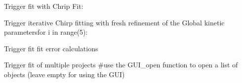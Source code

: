 \documentclass[letterpaper,10pt,english]{sphinxmanual}
\begin{document}
\begin{fulllineitems}
\begin{fulllineitems}
\begin{sphinxVerbatim}[commandchars=\\\{\}]
\end{sphinxVerbatim}

Trigger fit with Chrip Fit:

\begin{sphinxVerbatim}[commandchars=\\\{\}]
\end{sphinxVerbatim}

Trigger iterative Chirp fitting with fresh refinement of the Global kinetic parametersfor i in range(5):

\begin{sphinxVerbatim}[commandchars=\\\{\}]
   
    \PYG{p}{[}\PYG{p}{]}
    
    
      \PYG{p}{[}\PYG{p}{]}  
\end{sphinxVerbatim}

Trigger fit fit error calculations

\begin{sphinxVerbatim}[commandchars=\\\{\}]
\end{sphinxVerbatim}

Trigger fit of multiple projects
\#use the GUI\_open function to open a list of objects (leave empty for using the GUI)


\end{fulllineitems}
\end{fulllineitems}
\end{document}
